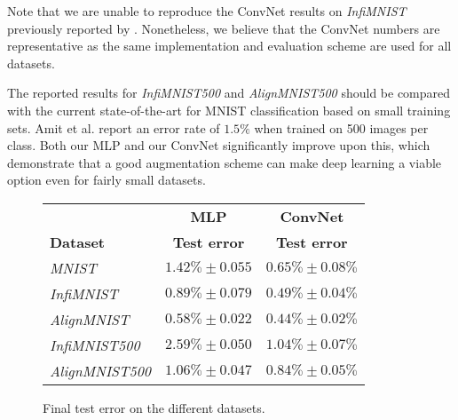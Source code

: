 \documentclass[twoside]{article}
\begin{document}
  Note that we are unable to reproduce the ConvNet results on \emph{InfiMNIST}
  previously reported by \cite{simard2003best}.
  Nonetheless, we believe that the ConvNet numbers are representative as the same
  implementation and evaluation scheme are used for all datasets.
  
  The reported results for \emph{InfiMNIST500} and \emph{AlignMNIST500} should be
  compared with the current state-of-the-art for MNIST classification based on
  small training sets. Amit et al. \cite{Amit:ijcv:2007} report an error rate of $1.5\%$
  when trained on 500 images per class. Both our MLP and our ConvNet significantly
  improve upon this, which demonstrate that a good augmentation scheme can make
  deep learning a viable option even for fairly small datasets.
  
  \begin{figure}
    \begin{tabular}{lcc}
                             & \textbf{MLP}           & \textbf{ConvNet} \\
      \textbf{Dataset}       & \textbf{Test error}    & \textbf{Test error} \\
      \hline
      \emph{MNIST}           & $1.42\% \pm 0.055$     & $0.65\% \pm 0.08\%$ \\ 
      \emph{InfiMNIST}       & $0.89\% \pm 0.079$     & $0.49\% \pm 0.04\%$ \\
      \emph{AlignMNIST}      & $0.58\% \pm 0.022$     & $0.44\% \pm 0.02\%$ \\ \hline
      \emph{InfiMNIST500}    & $2.59\% \pm 0.050$     & $1.04\% \pm 0.07\%$ \\
      \emph{AlignMNIST500}   & $1.06\% \pm 0.047$     & $0.84\% \pm 0.05\%$	
    \end{tabular}
    \caption{Final test error on the different datasets.}
    \label{fig:res}

\end{figure}
\end{document}
